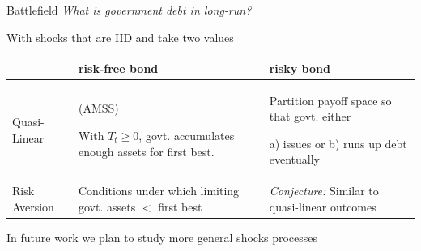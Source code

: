 \documentclass{beamer}
\begin{document}
%
%
%
%	
%	
%	
%
%
%
%
\begin{frame}{Battlefield}
\small
\textit{What is government debt in long-run?}


\vspace{3mm}

With shocks that are IID and take two values

\medskip


\begin{tabular}[h]{| l | p{1.25in} | p{1.25in} |}
	\hline
	&risk-free bond & risky bond \\
	\hline
	Quasi-Linear& (AMSS)
	
	With $T_t\geq 0$, govt. accumulates enough assets for first best.&Partition  payoff space so that govt. either
	
	a) issues or
	b) runs up debt eventually\\
	\hline
	Risk Aversion& Conditions under which limiting govt.	
	assets $<$ first best& \emph{Conjecture:} Similar to quasi-linear outcomes\\
	\hline
\end{tabular}


\vspace{4mm}

In future work we plan to study more general shocks processes

\end{frame}
\end{document}

